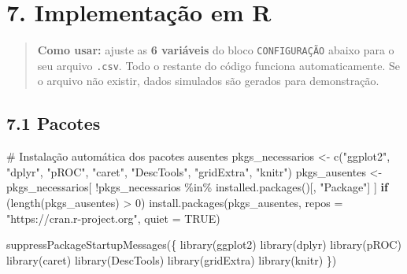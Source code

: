 \documentclass[
  letterpaper,
  DIV=11,
  numbers=noendperiod]{scrartcl}
\newenvironment{Shaded}{\begin{snugshade}}{\end{snugshade}}
\newcommand{\AttributeTok}[1]{\textcolor[rgb]{0.40,0.45,0.13}{#1}}
\newcommand{\CommentTok}[1]{\textcolor[rgb]{0.37,0.37,0.37}{#1}}
\newcommand{\ConstantTok}[1]{\textcolor[rgb]{0.56,0.35,0.01}{#1}}
\newcommand{\ControlFlowTok}[1]{\textcolor[rgb]{0.00,0.23,0.31}{\textbf{#1}}}
\newcommand{\DecValTok}[1]{\textcolor[rgb]{0.68,0.00,0.00}{#1}}
\newcommand{\FunctionTok}[1]{\textcolor[rgb]{0.28,0.35,0.67}{#1}}
\newcommand{\NormalTok}[1]{\textcolor[rgb]{0.00,0.23,0.31}{#1}}
\newcommand{\OtherTok}[1]{\textcolor[rgb]{0.00,0.23,0.31}{#1}}
\newcommand{\SpecialCharTok}[1]{\textcolor[rgb]{0.37,0.37,0.37}{#1}}
\newcommand{\StringTok}[1]{\textcolor[rgb]{0.13,0.47,0.30}{#1}}
\begin{document}
\section{7. Implementação em R}\label{implementauxe7uxe3o-em-r}

\begin{quote}
\textbf{Como usar:} ajuste as \textbf{6 variáveis} do bloco
\texttt{CONFIGURAÇÃO} abaixo para o seu arquivo \texttt{.csv}. Todo o
restante do código funciona automaticamente. Se o arquivo não existir,
dados simulados são gerados para demonstração.
\end{quote}

\subsection{7.1 Pacotes}\label{pacotes}

\begin{Shaded}
\begin{Highlighting}[]
\CommentTok{\# Instalação automática dos pacotes ausentes}
\NormalTok{pkgs\_necessarios }\OtherTok{\textless{}{-}} \FunctionTok{c}\NormalTok{(}\StringTok{"ggplot2"}\NormalTok{, }\StringTok{"dplyr"}\NormalTok{, }\StringTok{"pROC"}\NormalTok{, }\StringTok{"caret"}\NormalTok{,}
                      \StringTok{"DescTools"}\NormalTok{, }\StringTok{"gridExtra"}\NormalTok{, }\StringTok{"knitr"}\NormalTok{)}
\NormalTok{pkgs\_ausentes    }\OtherTok{\textless{}{-}}\NormalTok{ pkgs\_necessarios[}
  \SpecialCharTok{!}\NormalTok{pkgs\_necessarios }\SpecialCharTok{\%in\%} \FunctionTok{installed.packages}\NormalTok{()[, }\StringTok{"Package"}\NormalTok{]}
\NormalTok{]}
\ControlFlowTok{if}\NormalTok{ (}\FunctionTok{length}\NormalTok{(pkgs\_ausentes) }\SpecialCharTok{\textgreater{}} \DecValTok{0}\NormalTok{)}
  \FunctionTok{install.packages}\NormalTok{(pkgs\_ausentes, }\AttributeTok{repos =} \StringTok{"https://cran.r{-}project.org"}\NormalTok{,}
                   \AttributeTok{quiet =} \ConstantTok{TRUE}\NormalTok{)}

\FunctionTok{suppressPackageStartupMessages}\NormalTok{(\{}
  \FunctionTok{library}\NormalTok{(ggplot2)}
  \FunctionTok{library}\NormalTok{(dplyr)}
  \FunctionTok{library}\NormalTok{(pROC)}
  \FunctionTok{library}\NormalTok{(caret)}
  \FunctionTok{library}\NormalTok{(DescTools)}
  \FunctionTok{library}\NormalTok{(gridExtra)}
  \FunctionTok{library}\NormalTok{(knitr)}
\NormalTok{\})}
\end{Highlighting}
\end{Shaded}
\end{document}
